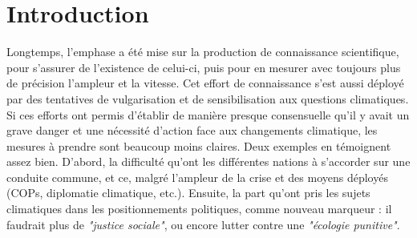 





\chapter*{Introduction}
\newrefsegment










Longtemps, l'emphase a été mise sur la production de connaissance scientifique, pour s'assurer de l'existence de celui-ci, puis pour en mesurer avec toujours plus de précision l'ampleur et la vitesse. Cet effort de connaissance s'est aussi déployé par des tentatives de vulgarisation et de sensibilisation aux questions climatiques. Si ces efforts ont permis d'établir de manière presque consensuelle qu'il y avait un grave danger et une nécessité d'action face aux changements climatique, les mesures à prendre sont beaucoup moins claires. Deux exemples en témoignent assez bien. D'abord, la difficulté qu'ont les différentes nations à s'accorder sur une conduite commune, et ce, malgré l'ampleur de la crise et des moyens déployés (COPs, diplomatie climatique, etc.). Ensuite, la part qu'ont pris les sujets climatiques dans les positionnements politiques, comme nouveau marqueur : il faudrait plus de \textit{"justice sociale"}, ou encore lutter contre une \textit{"écologie punitive"}. \\

